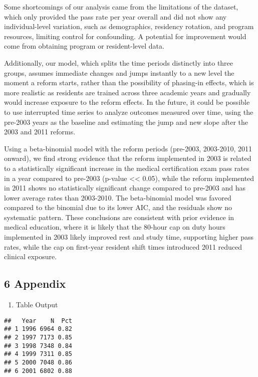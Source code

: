 \documentclass[
]{article}
\providecommand{\tightlist}{%
  \setlength{\itemsep}{0pt}\setlength{\parskip}{0pt}}
\begin{document}
Some shortcomings of our analysis came from the limitations of the
dataset, which only provided the pass rate per year overall and did not
show any individual-level variation, such as demographics, residency
rotation, and program resources, limiting control for confounding. A
potential for improvement would come from obtaining program or
resident-level data.

Additionally, our model, which splits the time periods distinctly into
three groups, assumes immediate changes and jumps instantly to a new
level the moment a reform starts, rather than the possibility of
phasing-in effects, which is more realistic as residents are trained
across three academic years and gradually would increase exposure to the
reform effects. In the future, it could be possible to use interrupted
time series to analyze outcomes measured over time, using the pre-2003
years as the baseline and estimating the jump and new slope after the
2003 and 2011 reforms.

Using a beta-binomial model with the reform periods (pre-2003,
2003-2010, 2011 onward), we find strong evidence that the reform
implemented in 2003 is related to a statistically significant increase
in the medical certification exam pass rates in a year compared to
pre-2003 (p-value \textless\textless{} 0.05), while the reform
implemented in 2011 shows no statistically significant change compared
to pre-2003 and has lower average rates than 2003-2010. The
beta-binomial model was favored compared to the binomial due to its
lower AIC, and the residuals show no systematic pattern. These
conclusions are consistent with prior evidence in medical education,
where it is likely that the 80-hour cap on duty hours implemented in
2003 likely improved rest and study time, supporting higher pass rates,
while the cap on first-year resident shift times introduced 2011 reduced
clinical exposure.

\subsection{6 Appendix}\label{appendix}

\begin{enumerate}
\def\labelenumi{\arabic{enumi}.}
\tightlist
\item
  Table Output
\end{enumerate}

\begin{verbatim}
##   Year    N  Pct
## 1 1996 6964 0.82
## 2 1997 7173 0.85
## 3 1998 7348 0.84
## 4 1999 7311 0.85
## 5 2000 7048 0.86
## 6 2001 6802 0.88
\end{verbatim}
\end{document}
